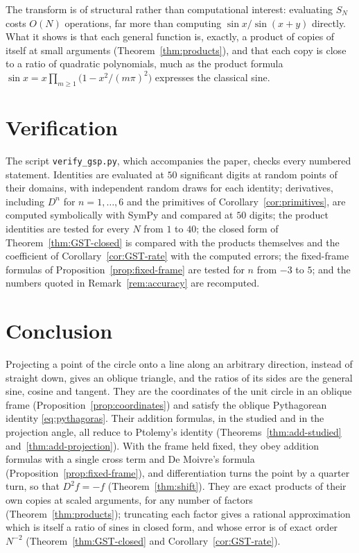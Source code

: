 \documentclass[11pt]{amsart}
\theoremstyle{definition}
\theoremstyle{remark}
\numberwithin{equation}{section}
\begin{document}
The transform is of structural rather than computational interest:
evaluating $S_N$ costs $O(N)$ operations, far more than computing
$\sin x/\sin(x+y)$ directly. What it shows is that each general function
is, exactly, a product of copies of itself at small arguments
(Theorem~\ref{thm:products}), and that each copy is close to a ratio of
quadratic polynomials, much as the product formula
$\sin x = x\prod_{m\ge1}\bigl(1 - x^2/(m\pi)^2\bigr)$ expresses the
classical sine.

\section{Verification}
\label{sec:verification}

The script \texttt{verify\_gsp.py}, which accompanies the paper, checks
every numbered statement. Identities are evaluated at $50$ significant
digits at random points of their domains, with independent random draws for
each identity; derivatives, including $D^n$ for $n = 1, \dots, 6$ and the
primitives of Corollary~\ref{cor:primitives}, are computed symbolically with
SymPy and compared at $50$ digits; the product identities are tested for
every $N$ from $1$ to $40$; the closed form of
Theorem~\ref{thm:GST-closed} is compared with the products themselves and
the coefficient of Corollary~\ref{cor:GST-rate} with the computed errors;
the fixed-frame formulas of Proposition~\ref{prop:fixed-frame} are tested
for $n$ from $-3$ to $5$; and the numbers quoted in
Remark~\ref{rem:accuracy} are recomputed.

\section{Conclusion}
\label{sec:conclusion}

Projecting a point of the circle onto a line along an arbitrary direction,
instead of straight down, gives an oblique triangle, and the ratios of its
sides are the general sine, cosine and tangent. They are the coordinates
of the unit circle in an oblique frame
(Proposition~\ref{prop:coordinates}) and satisfy the oblique Pythagorean
identity \eqref{eq:pythagoras}. Their addition formulas, in the studied
and in the projection angle, all reduce to Ptolemy's identity
(Theorems~\ref{thm:add-studied} and~\ref{thm:add-projection}).
With the frame held fixed, they obey addition formulas with a single
cross term and De Moivre's formula (Proposition~\ref{prop:fixed-frame}),
and differentiation turns the point by a quarter turn, so that
$D^2 f = -f$ (Theorem~\ref{thm:shift}). They are exact products of their
own copies at scaled arguments, for any number of factors
(Theorem~\ref{thm:products}); truncating each factor gives a rational
approximation which is itself a ratio of sines in closed form, and whose
error is of exact order $N^{-2}$ (Theorem~\ref{thm:GST-closed} and
Corollary~\ref{cor:GST-rate}).
\end{document}

